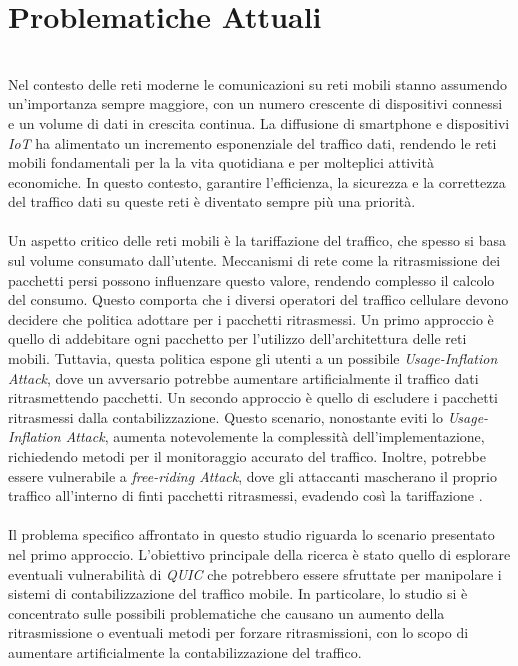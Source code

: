 \section{Problematiche Attuali}
\label{Problema}
~\\
\indent Nel contesto delle reti moderne le comunicazioni su reti mobili stanno assumendo un'importanza sempre maggiore, con un numero crescente di dispositivi connessi e un volume di dati in crescita continua. 
La diffusione di smartphone e dispositivi \emph{IoT} ha alimentato un incremento esponenziale del traffico dati, rendendo le reti mobili fondamentali per la la vita quotidiana e per molteplici attività economiche.
In questo contesto, garantire l'efficienza, la sicurezza e la correttezza del traffico dati su queste reti è diventato sempre più una priorità.
\\\\
Un aspetto critico delle reti mobili è la tariffazione del traffico, che spesso si basa sul volume consumato dall'utente. 
Meccanismi di rete come la ritrasmissione dei pacchetti persi possono influenzare questo valore, rendendo complesso il calcolo del consumo. 
Questo comporta che i diversi operatori del traffico cellulare devono decidere che politica adottare per i pacchetti ritrasmessi.
Un primo approccio è quello di addebitare ogni pacchetto per l'utilizzo dell'architettura delle reti mobili. 
Tuttavia, questa politica espone gli utenti a un possibile \emph{Usage-Inflation Attack}, dove un avversario potrebbe aumentare artificialmente il traffico dati ritrasmettendo pacchetti.
Un secondo approccio è quello di escludere i pacchetti ritrasmessi dalla contabilizzazione. Questo scenario, nonostante eviti lo \emph{Usage-Inflation Attack}, aumenta notevolemente la complessità dell'implementazione, richiedendo metodi per il monitoraggio accurato del traffico.
Inoltre, potrebbe essere vulnerabile a \emph{free-riding Attack}, dove gli attaccanti mascherano il proprio traffico all'interno di finti pacchetti ritrasmessi, evadendo così la tariffazione \cite{article:cellular}.
\\\\
Il problema specifico affrontato in questo studio riguarda lo scenario presentato nel primo approccio. L'obiettivo principale della ricerca è stato quello di esplorare eventuali vulnerabilità di \emph{QUIC} che potrebbero essere sfruttate per manipolare i sistemi di contabilizzazione del traffico mobile.
In particolare, lo studio si è concentrato sulle possibili problematiche che causano un aumento della ritrasmissione o eventuali metodi per forzare ritrasmissioni, con lo scopo di aumentare artificialmente la contabilizzazione del traffico.


